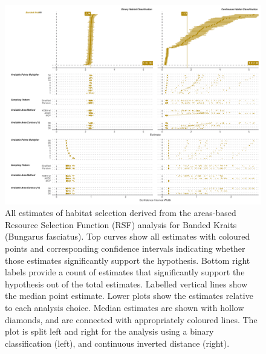 \documentclass[10pt,a4paper]{article}
\begin{document}
\begin{figure}
\includegraphics[width=1\linewidth]{../../figures/specCurve_Banded Krait_rsf} \caption{All estimates of habitat selection derived from the areas-based Resource Selection Function (RSF) analysis for Banded Kraits (Bungarus fasciatus). Top curves show all estimates with coloured points and corresponding confidence intervals indicating whether those estimates significantly support the hypothesis. Bottom right labels provide a count of estimates that significantly support the hypothesis out of the total estimates. Labelled vertical lines show the median point estimate. Lower plots show the estimates relative to each analysis choice. Median estimates are shown with hollow diamonds, and are connected with appropriately coloured lines. The plot is split left and right for the analysis using a binary classification (left), and continuous inverted distance (right).}\label{fig:specCurveRsfBUFA}
\end{figure}
\end{document}
